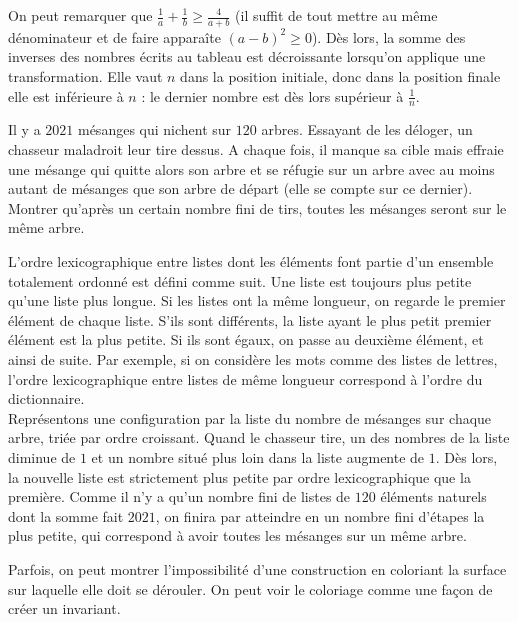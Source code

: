 \begin{sol}
On peut remarquer que $\frac1{a}+\frac1{b}\geq \frac{4}{a+b}$ (il suffit de tout mettre au même dénominateur et de faire apparaîte $(a-b)^2\geq0$). Dès lors, la somme des inverses des nombres écrits au tableau est décroissante lorsqu'on applique une transformation. Elle vaut $n$ dans la position initiale, donc dans la position finale elle est inférieure à $n$ : le dernier nombre est dès lors supérieur à $\frac1{n}$.
\end{sol}

\begin{exo}
Il y a $2021$ mésanges qui nichent sur $120$ arbres. Essayant de les déloger, un chasseur maladroit leur tire dessus. A chaque fois, il manque sa cible mais effraie une mésange qui quitte alors son arbre et se réfugie sur un arbre avec au moins autant de mésanges que son arbre de départ (elle se compte sur ce dernier). Montrer qu'après un certain nombre fini de tirs, toutes les mésanges seront sur le même arbre.
\end{exo}

\begin{sol}
L'ordre lexicographique entre listes dont les éléments font partie d'un ensemble totalement ordonné est défini comme suit. Une liste est toujours plus petite qu'une liste plus longue. Si les listes ont la même longueur, on regarde le premier élément de chaque liste. S'ils sont différents, la liste ayant le plus petit premier élément est la plus petite. Si ils sont égaux, on passe au deuxième élément, et ainsi de suite. Par exemple, si on considère les mots comme des listes de lettres, l'ordre lexicographique entre listes de même longueur correspond à l'ordre du dictionnaire.\\
Représentons une configuration par la liste du nombre de mésanges sur chaque arbre, triée par ordre croissant. Quand le chasseur tire, un des nombres de la liste diminue de $1$ et un nombre situé plus loin dans la liste augmente de $1$. Dès lors, la nouvelle liste est strictement plus petite par ordre lexicographique que la première. Comme il n'y a qu'un nombre fini de listes de $120$ éléments naturels dont la somme fait $2021$, on finira par atteindre en un nombre fini d'étapes la plus petite, qui correspond à avoir toutes les mésanges sur un même arbre.
\end{sol}


Parfois, on peut montrer l'impossibilité d'une construction en coloriant la surface sur laquelle elle doit se dérouler. On peut voir le coloriage comme une façon de créer un invariant.\\ 

